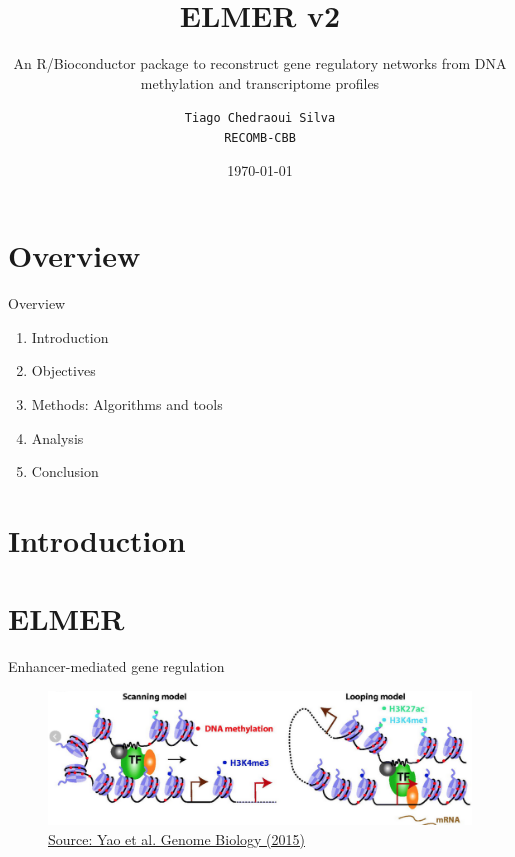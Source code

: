 \documentclass[slidestop,compress,11pt,xcolor=dvipsnames]{beamer}
\title{ELMER v2}
\subtitle{An R/Bioconductor package to reconstruct gene regulatory networks from DNA methylation and transcriptome profiles}
\date{\today}
\author[Tiago Chedraoui Silva]{\texttt {Tiago Chedraoui Silva}\\ \texttt{RECOMB-CBB}} %
\institute{University of São Paulo / Cedar-Sinai }
\begin{document}
%
%

{
\maketitle
}


\section*{Overview}
\begin{frame}{Overview}
\begin{enumerate}
\setlength\itemsep{2em}
\item Introduction
\item Objectives
\item Methods: Algorithms and tools
\item Analysis
\item Conclusion
\end{enumerate}
\end{frame}


%
%

\section{Introduction}

\section{ELMER}

\begin{frame}{Enhancer-mediated gene regulation}
 \vspace*{1.0cm}
 \begin{figure}
  \centering
  \includegraphics[width=1.0\linewidth]{ELMER/elmer.png}{\tiny{\\\href{https://genomebiology.biomedcentral.com/articles/10.1186/s13059-015-0668-3}{Source: Yao et al. Genome Biology (2015)}}}
 \end{figure}
\end{frame}
\end{document}
